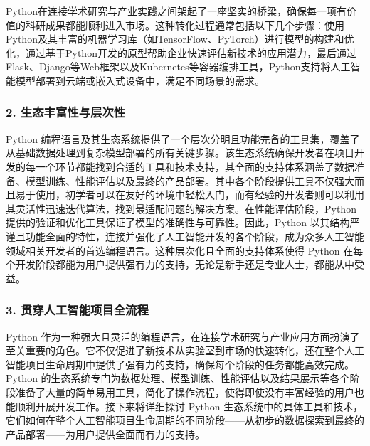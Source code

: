 Python在连接学术研究与产业实践之间架起了一座坚实的桥梁，确保每一项有价值的科研成果都能顺利进入市场。这种转化过程通常包括以下几个步骤：使用Python及其丰富的机器学习库（如TensorFlow、PyTorch）进行模型的构建和优化，通过基于Python开发的原型帮助企业快速评估新技术的应用潜力，最后通过Flask、Django等Web框架以及Kubernetes等容器编排工具，Python支持将人工智能模型部署到云端或嵌入式设备中，满足不同场景的需求。

\subsubsection{2. 生态丰富性与层次性}

Python 编程语言及其生态系统提供了一个层次分明且功能完备的工具集，覆盖了从基础数据处理到复杂模型部署的所有关键步骤。该生态系统确保开发者在项目开发的每一个环节都能找到合适的工具和技术支持，其全面的支持体系涵盖了数据准备、模型训练、性能评估以及最终的产品部署。其中各个阶段提供工具不仅强大而且易于使用，初学者可以在友好的环境中轻松入门，而有经验的开发者则可以利用其灵活性迅速迭代算法，找到最适配问题的解决方案。在性能评估阶段，Python 提供的验证和优化工具保证了模型的准确性与可靠性。因此，Python 以其结构严谨且功能全面的特性，连接并强化了人工智能开发的各个阶段，成为众多人工智能领域相关开发者的首选编程语言。这种层次化且全面的支持体系使得 Python 在每个开发阶段都能为用户提供强有力的支持，无论是新手还是专业人士，都能从中受益。

\subsubsection{3. 贯穿人工智能项目全流程}

Python 作为一种强大且灵活的编程语言，在连接学术研究与产业应用方面扮演了至关重要的角色。它不仅促进了新技术从实验室到市场的快速转化，还在整个人工智能项目生命周期中提供了强有力的支持，确保每个阶段的任务都能高效完成。Python 的生态系统专门为数据处理、模型训练、性能评估以及结果展示等各个阶段准备了大量的简单易用工具，简化了操作流程，使得即使没有丰富经验的用户也能顺利开展开发工作。接下来将详细探讨 Python 生态系统中的具体工具和技术，它们如何在整个人工智能项目生命周期的不同阶段——从初步的数据探索到最终的产品部署——为用户提供全面而有力的支持。

